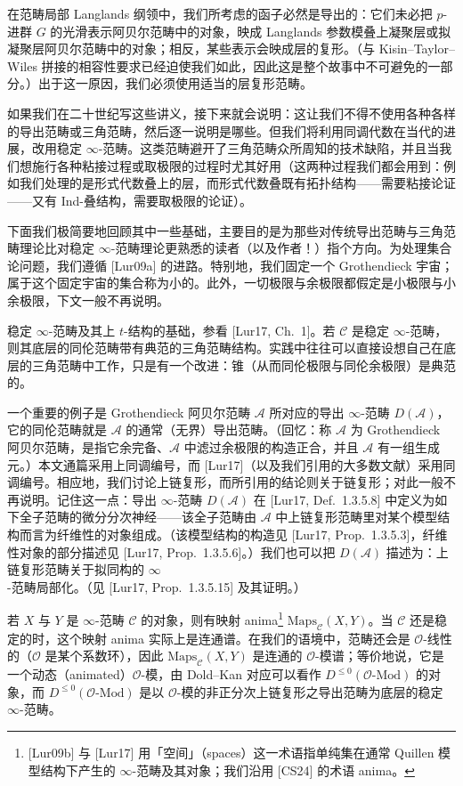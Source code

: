 在范畴局部 Langlands 纲领中，我们所考虑的函子必然是导出的：它们未必把 $p$-进群 $G$ 的光滑表示阿贝尔范畴中的对象，映成 Langlands 参数模叠上凝聚层或拟凝聚层阿贝尔范畴中的对象；相反，某些表示会映成层的复形。（与 Kisin--Taylor--Wiles 拼接的相容性要求已经迫使我们如此，因此这是整个故事中不可避免的一部分。）出于这一原因，我们必须使用适当的层复形范畴。

如果我们在二十世纪写这些讲义，接下来就会说明：这让我们不得不使用各种各样的导出范畴或三角范畴，然后逐一说明是哪些。但我们将利用同调代数在当代的进展，改用稳定 $\infty$-范畴。这类范畴避开了三角范畴众所周知的技术缺陷，并且当我们想施行各种粘接过程或取极限的过程时尤其好用（这两种过程我们都会用到：例如我们处理的是形式代数叠上的层，而形式代数叠既有拓扑结构——需要粘接论证——又有 Ind-叠结构，需要取极限的论证）。

下面我们极简要地回顾其中一些基础，主要目的是为那些对传统导出范畴与三角范畴理论比对稳定 $\infty$-范畴理论更熟悉的读者（以及作者！）指个方向。为处理集合论问题，我们遵循 [Lur09a] 的进路。特别地，我们固定一个 Grothendieck 宇宙；属于这个固定宇宙的集合称为小的。此外，一切极限与余极限都假定是小极限与小余极限，下文一般不再说明。


稳定 $\infty$-范畴及其上 $t$-结构的基础，参看 [Lur17, Ch.~1]。若 $\mathcal C$ 是稳定 $\infty$-范畴，则其底层的同伦范畴带有典范的三角范畴结构。实践中往往可以直接设想自己在底层的三角范畴中工作，只是有一个改进：锥（从而同伦极限与同伦余极限）是典范的。

一个重要的例子是 Grothendieck 阿贝尔范畴 $\mathcal A$ 所对应的导出 $\infty$-范畴 $D(\mathcal A)$，它的同伦范畴就是 $\mathcal A$ 的通常（无界）导出范畴。（回忆：称 $\mathcal A$ 为 Grothendieck 阿贝尔范畴，是指它余完备、$\mathcal A$ 中滤过余极限的构造正合，并且 $\mathcal A$ 有一组生成元。）本文通篇采用上同调编号，而 [Lur17]（以及我们引用的大多数文献）采用同调编号。相应地，我们讨论上链复形，而所引用的结论则关于链复形；对此一般不再说明。记住这一点：导出 $\infty$-范畴 $D(\mathcal A)$ 在 [Lur17, Def.~1.3.5.8] 中定义为如下全子范畴的微分分次神经——该全子范畴由 $\mathcal A$ 中上链复形范畴里对某个模型结构而言为纤维性的对象组成。（该模型结构的构造见 [Lur17, Prop.~1.3.5.3]，纤维性对象的部分描述见 [Lur17, Prop.~1.3.5.6]。）我们也可以把 $D(\mathcal A)$ 描述为：上链复形范畴关于拟同构的 $\infty$-范畴局部化。（见 [Lur17, Prop.~1.3.5.15] 及其证明。）

若 $X$ 与 $Y$ 是 $\infty$-范畴 $\mathcal C$ 的对象，则有映射 anima\footnote{[Lur09b] 与 [Lur17] 用「空间」（spaces）这一术语指单纯集在通常 Quillen 模型结构下产生的 $\infty$-范畴及其对象；我们沿用 [CS24] 的术语 anima。} $\mathrm{Maps}_{\mathcal C}(X,Y)$。当 $\mathcal C$ 还是稳定的时，这个映射 anima 实际上是连通谱。在我们的语境中，范畴还会是 $\mathcal O$-线性的（$\mathcal O$ 是某个系数环），因此 $\mathrm{Maps}_{\mathcal C}(X,Y)$ 是连通的 $\mathcal O$-模谱；等价地说，它是一个动态（animated）$\mathcal O$-模，由 Dold--Kan 对应可以看作 $D^{\leq0}(\mathcal O\text{-}\mathrm{Mod})$ 的对象，而 $D^{\leq0}(\mathcal O\text{-}\mathrm{Mod})$ 是以 $\mathcal O$-模的非正分次上链复形之导出范畴为底层的稳定 $\infty$-范畴。

